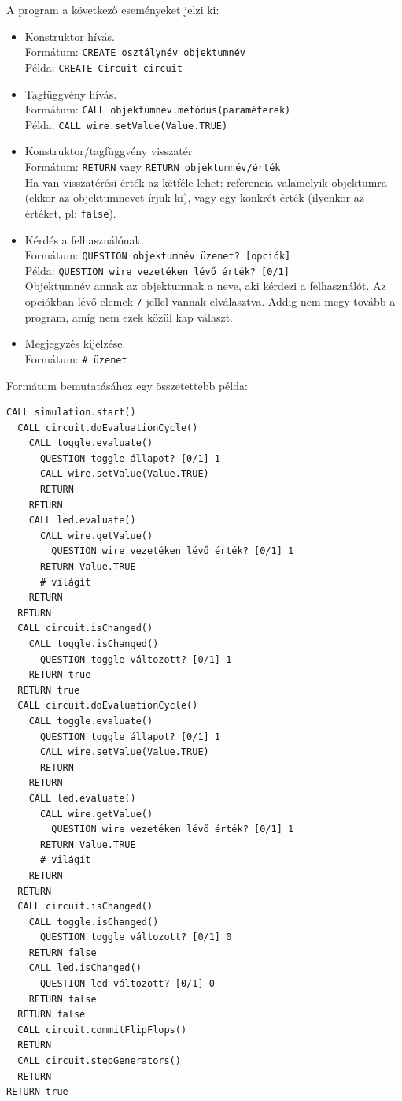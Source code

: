 A program a következő eseményeket jelzi ki:
\begin{itemize}
\item Konstruktor hívás.\\
	  Formátum: \texttt{CREATE osztálynév objektumnév}\\
	  Példa: \texttt{CREATE Circuit circuit}
\item Tagfüggvény hívás.\\
	  Formátum: \texttt{CALL objektumnév.metódus(paraméterek)}\\
	  Példa: \texttt{CALL wire.setValue(Value.TRUE)}
\item Konstruktor/tagfüggvény visszatér\\
	  Formátum: \texttt{RETURN} vagy \texttt{RETURN objektumnév/érték}\\
	  Ha van visszatérési érték az kétféle lehet: referencia valamelyik objektumra (ekkor az objektumnevet írjuk ki), vagy egy konkrét érték (ilyenkor az értéket, pl: \texttt{false}).
\item Kérdés a felhasználónak.\\
	  Formátum: \texttt{QUESTION objektumnév üzenet? [opciók]}\\
	  Példa: \texttt{QUESTION wire vezetéken lévő érték? [0/1]}\\
	  Objektumnév annak az objektumnak a neve, aki kérdezi a felhasználót. Az opciókban lévő elemek \texttt{/} jellel vannak elválasztva. Addig nem megy tovább a program, amíg nem ezek közül kap választ.
\item Megjegyzés kijelzése.\\
	Formátum: \texttt{\# üzenet}
\end{itemize}

Formátum bemutatásához egy összetettebb példa:

\begin{verbatim}
CALL simulation.start()
  CALL circuit.doEvaluationCycle()
    CALL toggle.evaluate()
      QUESTION toggle állapot? [0/1] 1
      CALL wire.setValue(Value.TRUE)
      RETURN
    RETURN
    CALL led.evaluate()
      CALL wire.getValue()
        QUESTION wire vezetéken lévő érték? [0/1] 1
      RETURN Value.TRUE
      # világít
    RETURN
  RETURN
  CALL circuit.isChanged()
    CALL toggle.isChanged()
      QUESTION toggle változott? [0/1] 1
    RETURN true
  RETURN true
  CALL circuit.doEvaluationCycle()
    CALL toggle.evaluate()
      QUESTION toggle állapot? [0/1] 1
      CALL wire.setValue(Value.TRUE)
      RETURN
    RETURN
    CALL led.evaluate()
      CALL wire.getValue()
        QUESTION wire vezetéken lévő érték? [0/1] 1
      RETURN Value.TRUE
      # világít
    RETURN
  RETURN
  CALL circuit.isChanged()
    CALL toggle.isChanged()
      QUESTION toggle változott? [0/1] 0
    RETURN false
    CALL led.isChanged()
      QUESTION led változott? [0/1] 0
    RETURN false
  RETURN false
  CALL circuit.commitFlipFlops()
  RETURN
  CALL circuit.stepGenerators()
  RETURN
RETURN true
\end{verbatim}

